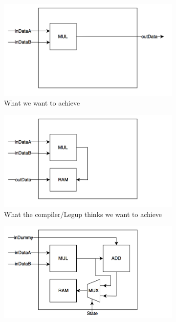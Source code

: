 \begin{figure}[hbpt]
        \centering
        \begin{subfigure}{0.49\textwidth}\centering%
                    \includegraphics[width=\linewidth]{figs/OutputAssignment1.png}
                \caption{What we want to achieve}
  \label{fig:assignoutputs1}
       \end{subfigure}%
    \hfill
        \begin{subfigure}{0.49\textwidth}\centering
                    \includegraphics[width=\linewidth]{figs/OutputAssignment2.png}
                \caption{What the compiler/Legup thinks we want to achieve}
  \label{fig:assignoutputs2}
       \end{subfigure}%
    \hfill
        \begin{subfigure}{0.49\textwidth}\centering
                    \includegraphics[width=\linewidth]{figs/OutputAssignment3.png}

\end{subfigure}
\end{figure}
